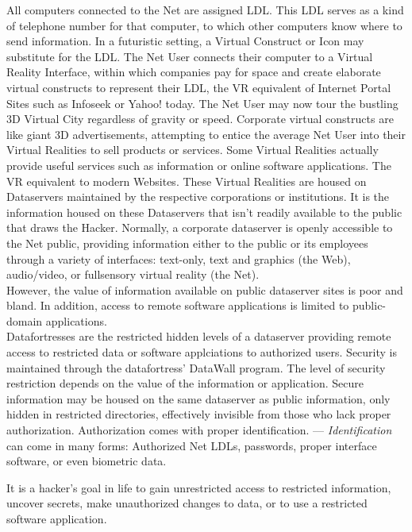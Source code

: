 \documentclass[11pt,twoside,a4paper]{article}
\begin{document}
\begin{multicols*}{2}
All computers connected to the Net are assigned LDL. This LDL serves as a kind of telephone number for that computer, to which other computers know where to send information. In a futuristic setting, a Virtual Construct or Icon may substitute for the LDL. The Net User connects their computer to a Virtual Reality Interface, within which companies pay for space and create elaborate virtual constructs to represent their LDL, the VR equivalent of Internet Portal Sites such as Infoseek or Yahoo! today. The Net User may now tour the bustling 3D Virtual City regardless of gravity or speed. Corporate virtual constructs are like giant 3D advertisements, attempting to entice the average Net User into their Virtual Realities to sell products or services. Some Virtual Realities actually provide useful services such as information or online software applications. The VR equivalent to modern Websites. These Virtual Realities are housed on Dataservers maintained by the respective corporations or institutions. It is the information housed on these Dataservers that isn't readily available to the public that draws the Hacker. Normally, a corporate dataserver is openly accessible to the Net public, providing information either to the public or its employees through a variety of interfaces: text-only, text and graphics (the Web), audio/video, or fullsensory virtual reality (the Net). ~\\

However, the value of information available on public dataserver sites is poor and bland. In addition, access to remote software applications is limited to public-domain applications. ~\\

Datafortresses are the restricted hidden levels of a dataserver providing remote access to restricted data or software applciations to authorized users. Security is maintained through the datafortress' DataWall program. The level of security restriction depends on the value of the information or application. Secure information may be housed on the same dataserver as public information, only hidden in restricted directories, effectively invisible from those who lack proper authorization. Authorization comes with proper identification. --- \emph{Identification} can come in many forms: Authorized Net LDLs, passwords, proper interface software, or even biometric data. %

It is a hacker's goal in life to gain unrestricted access to restricted information, uncover secrets, make unauthorized changes to data, or to use a restricted software application. ~\\


\end{multicols*}
\end{document}
